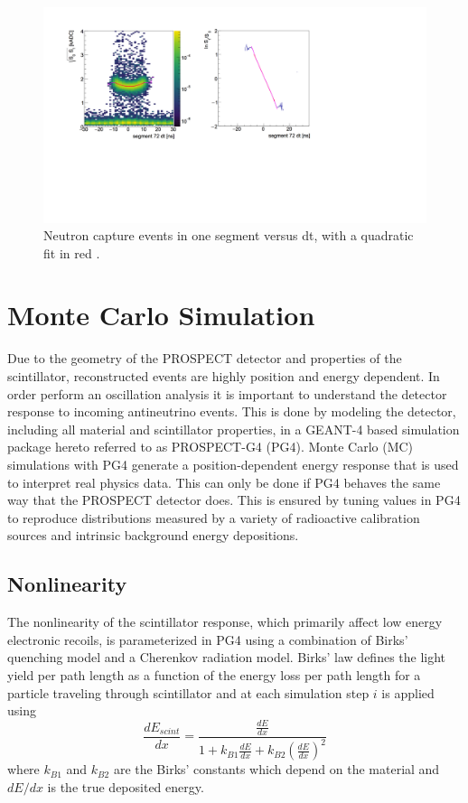 \begin{figure}[h]
	\centering
	\includegraphics[width=0.5\linewidth]{tex/5-analysis-images/nLi_vs_dt}
	\caption[Energy position dependence]{Neutron capture events in one segment versus dt, with a quadratic fit in red \cite{MM:2314}.}
	\label{fig:nlivsdt}
\end{figure}



\section{Monte Carlo Simulation}

Due to the geometry of the PROSPECT detector and properties of the scintillator, reconstructed events are highly position and energy dependent. 
In order perform an oscillation analysis it is important to understand the detector response to incoming antineutrino events. 
This is done by modeling the detector, including all material and scintillator properties, in a GEANT-4 based simulation package hereto referred to as PROSPECT-G4 (PG4).
Monte Carlo (MC) simulations with PG4 generate a position-dependent energy response that is used to interpret real physics data. 
This can only be done if PG4 behaves the same way that the PROSPECT detector does. 
This is ensured by tuning values in PG4 to reproduce distributions measured by a variety of radioactive calibration sources and intrinsic background energy depositions.

\subsection{Nonlinearity}

The nonlinearity of the scintillator response, which primarily affect low energy electronic recoils, is parameterized in PG4 using a combination of Birks' quenching model \cite{BIRKS1964269} and a Cherenkov radiation model.
Birks' law defines the light yield per path length as a function of the energy loss per path length for a particle traveling through scintillator and at each simulation step $i$ is applied using
\begin{equation}
	\frac{dE_{scint}}{dx} = \frac{\frac{dE}{dx}}{1 + k_{B1}\frac{dE}{dx} + k_{B2}\left(\frac{dE}{dx}\right)^2}
\end{equation}
where $k_{B1}$ and $k_{B2}$ are the Birks' constants which depend on the material and $dE/dx$ is the true deposited energy.

